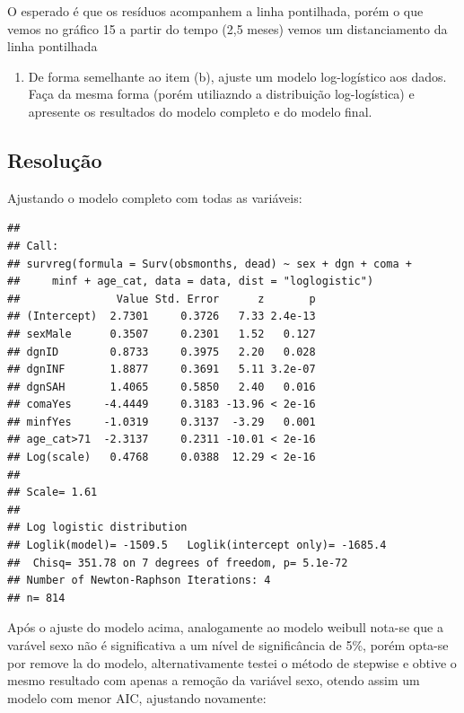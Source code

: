 \documentclass[]{article}
\providecommand{\tightlist}{%
  \setlength{\itemsep}{0pt}\setlength{\parskip}{0pt}}
\begin{document}
O esperado é que os resíduos acompanhem a linha pontilhada, porém o que
vemos no gráfico 15 a partir do tempo (2,5 meses) vemos um
distanciamento da linha pontilhada

\begin{enumerate}
\def\labelenumi{(\alph{enumi})}
\setcounter{enumi}{4}
\tightlist
\item
  De forma semelhante ao item (b), ajuste um modelo log-logístico aos
  dados. Faça da mesma forma (porém utiliazndo a distribuição
  log-logística) e apresente os resultados do modelo completo e do
  modelo final.
\end{enumerate}

\newpage

\subsection{Resolução}\label{resolucao-4}

Ajustando o modelo completo com todas as variáveis:

\begin{verbatim}
## 
## Call:
## survreg(formula = Surv(obsmonths, dead) ~ sex + dgn + coma + 
##     minf + age_cat, data = data, dist = "loglogistic")
##               Value Std. Error      z       p
## (Intercept)  2.7301     0.3726   7.33 2.4e-13
## sexMale      0.3507     0.2301   1.52   0.127
## dgnID        0.8733     0.3975   2.20   0.028
## dgnINF       1.8877     0.3691   5.11 3.2e-07
## dgnSAH       1.4065     0.5850   2.40   0.016
## comaYes     -4.4449     0.3183 -13.96 < 2e-16
## minfYes     -1.0319     0.3137  -3.29   0.001
## age_cat>71  -2.3137     0.2311 -10.01 < 2e-16
## Log(scale)   0.4768     0.0388  12.29 < 2e-16
## 
## Scale= 1.61 
## 
## Log logistic distribution
## Loglik(model)= -1509.5   Loglik(intercept only)= -1685.4
##  Chisq= 351.78 on 7 degrees of freedom, p= 5.1e-72 
## Number of Newton-Raphson Iterations: 4 
## n= 814
\end{verbatim}

Após o ajuste do modelo acima, analogamente ao modelo weibull nota-se
que a varável sexo não é significativa a um nível de significância de
5\%, porém opta-se por remove la do modelo, alternativamente testei o
método de stepwise e obtive o mesmo resultado com apenas a remoção da
variável sexo, otendo assim um modelo com menor AIC, ajustando
novamente:
\end{document}

